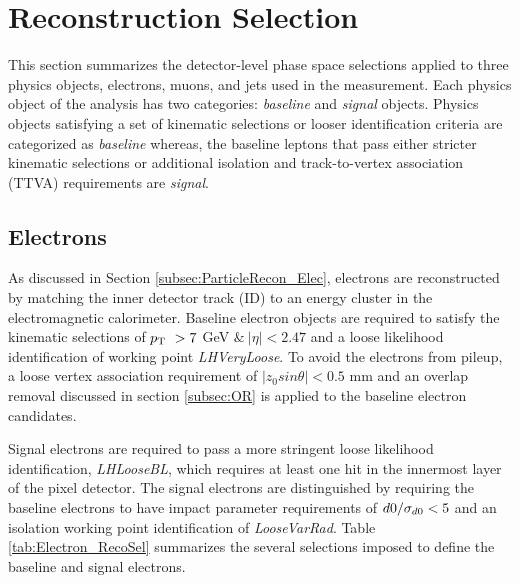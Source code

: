 \section{Reconstruction Selection}
\label{sec:ObjReconstruction}

This section summarizes the detector-level phase space selections applied to three physics objects, electrons, muons, and jets used in the measurement. Each physics object of the analysis has two categories: \textit{baseline} and \textit{signal} objects. Physics objects satisfying a set of kinematic selections or looser identification criteria are categorized as \textit{baseline} whereas, the baseline leptons that pass either stricter kinematic selections or additional isolation and track-to-vertex association (TTVA) requirements are \textit{signal}.

\subsection{Electrons}
\label{subsec:ElecRecon}

As discussed in Section \ref{subsec:ParticleRecon_Elec}, electrons are reconstructed by matching the inner detector track (ID) to an energy cluster in the electromagnetic calorimeter. Baseline electron objects are required to satisfy the kinematic selections of $p_{\textrm{T} ~} > 7$ GeV $ \&~ |\eta| < 2.47$ and a loose likelihood identification of working point \textit{LHVeryLoose}. To avoid the electrons from pileup, a loose vertex association requirement of $|z_{0}sin\theta| < 0.5 $ mm and an overlap removal discussed in section \ref{subsec:OR} is applied to the baseline electron candidates.

Signal electrons are required to pass a more stringent loose likelihood identification, \textit{LHLooseBL}, which requires at least one hit in the innermost layer of the pixel detector. The signal electrons are distinguished by requiring the baseline electrons to have impact parameter requirements of $d0/ \sigma_{d0} < 5$ and an isolation working point identification of \textit{LooseVarRad}. Table \ref{tab:Electron_RecoSel} summarizes the several selections imposed to define the baseline and signal electrons.

